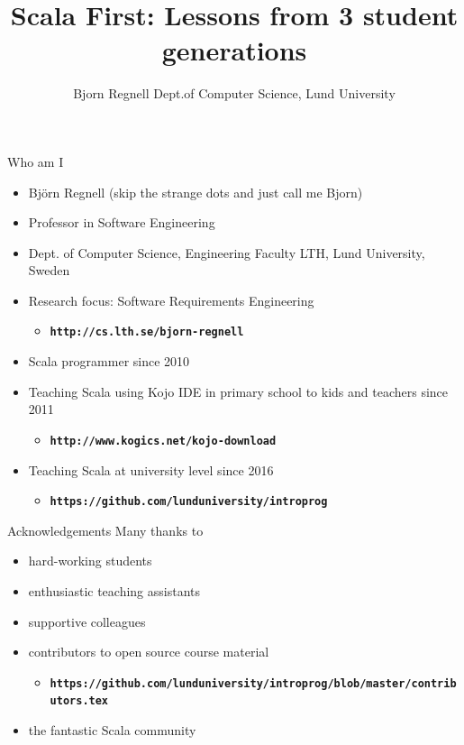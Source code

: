 \documentclass[aspectratio=169]{beamer}
\title[Scala First Lessons]{Scala First: \vspace{0.25em}\newline \fontsize{16}{25}\selectfont Lessons from 3 student generations }
\author[cs.lth.se/bjorn-regnell]{%
  Bjorn Regnell\newline
  Dept.\@ of Computer Science, Lund University}
\newcommand{\TitleSlide}{\begin{frame}[plain]\titlepage\end{frame}}
\newenvironment{Slide}[1]%
  {\begin{frame}[environment=Slide]{#1}}
  {\end{frame}}%
\begin{document}
\TitleSlide


\begin{Slide}{Who am I}
\begin{itemize}
\item Björn Regnell (skip the strange dots and just call me Bjorn)
\item Professor in Software Engineering
\item Dept. of Computer Science, Engineering Faculty LTH, Lund University, Sweden
\item Research focus: Software Requirements Engineering
\begin{itemize}
  \item \textbf{\texttt{http://cs.lth.se/bjorn-regnell}}  
\end{itemize}  
  
\item Scala programmer since 2010 
\item Teaching Scala using Kojo IDE in primary school to kids and teachers since 2011
\begin{itemize}
  \item \textbf{\texttt{http://www.kogics.net/kojo-download}}  
\end{itemize}  

\item Teaching Scala at university level since 2016
\begin{itemize}
  \item \textbf{\texttt{https://github.com/lunduniversity/introprog}}  
\end{itemize}  

\end{itemize}  


\end{Slide}

\begin{Slide}{Acknowledgements}
  Many thanks to
  \begin{itemize}
    \item hard-working students
    \item enthusiastic teaching assistants
    \item supportive colleagues
    \item contributors to open source course material
    \begin{itemize}
      \item \textbf{\fontsize{8}{12}\selectfont\texttt{https://github.com/lunduniversity/introprog/blob/master/contributors.tex}}      
    \end{itemize}
    \item the fantastic Scala community 
  \end{itemize}
\end{Slide}
\end{document}
